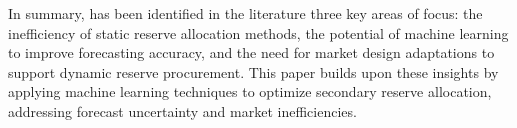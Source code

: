 In summary, has been identified in the literature three key areas of focus: the inefficiency of static reserve allocation methods, the potential of machine learning to improve forecasting accuracy, and the need for market design adaptations to support dynamic reserve procurement. This paper builds upon these insights by applying machine learning techniques to optimize secondary reserve allocation, addressing forecast uncertainty and market inefficiencies.\par
